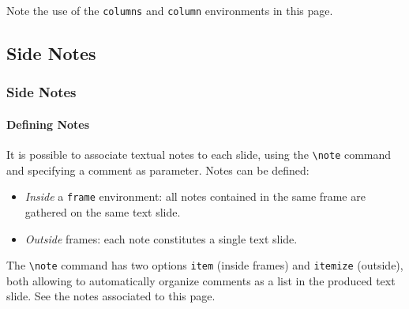 \documentclass[10pt,    %
    english,            %
    xcolor=table,       %
    envcountsect,       %
    aspectratio=43      %
]{beamer}
\begin{document}
\begin{frame}
    
    \medskip
    Note the use of the \texttt{columns} and \texttt{column} environments in this page.
\end{frame}



\subsection{Side Notes}
\begin{frame}
    \frametitle{Side Notes}
    \framesubtitle{Defining Notes}
    
    It is possible to associate textual notes to each slide, using the \texttt{\textbackslash{}note} command and specifying a comment as parameter. Notes can be defined:
    \begin{itemize}
        \item \textit{Inside} a \texttt{frame} environment: all notes contained in the same frame are gathered on the same text slide.
        \item \textit{Outside} frames: each note constitutes a single text slide.
    \end{itemize}
    
    \medskip
    The \texttt{\textbackslash{}note} command has two options \texttt{item} (inside frames) and \texttt{itemize} (outside), both allowing to automatically organize comments as a list in the produced text slide. See the notes associated to this page.
\end{frame}
\end{document}
